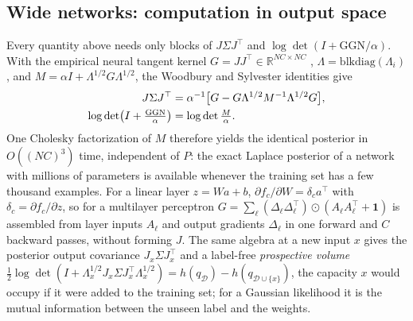 \documentclass[10pt,twocolumn,letterpaper]{article}
\theoremstyle{definition}
\newcommand{\logdet}{\log\det}
\newcommand{\D}{\mathcal{D}}
\newcommand{\T}{^{\top}}
\begin{document}
\subsection{Wide networks: computation in output space}\label{sec:kernel}
Every quantity above needs only blocks of $J\Sigma J\T$ and $\logdet(I+\mathrm{GGN}/\alpha)$. With the empirical neural tangent kernel $G=JJ\T\in\mathbb{R}^{NC\times NC}$ \citep{jacot2018}, $\Lambda=\mathrm{blkdiag}(\Lambda_i)$, and $M=\alpha I+\Lambda^{1/2}G\Lambda^{1/2}$, the Woodbury and Sylvester identities give
\begin{align}
J\Sigma J\T&=\alpha^{-1}\big[G-G\Lambda^{1/2}M^{-1}\Lambda^{1/2}G\big],\notag\\
\logdet\!\big(I+\tfrac{\mathrm{GGN}}{\alpha}\big)&=\logdet\tfrac{M}{\alpha}.
\label{eq:kernel}
\end{align}
One Cholesky factorization of $M$ therefore yields the identical posterior in $O((NC)^3)$ time, independent of $P$: the exact Laplace posterior of a network with millions of parameters is available whenever the training set has a few thousand examples. For a linear layer $z=Wa+b$, $\partial f_c/\partial W=\delta_c a\T$ with $\delta_c=\partial f_c/\partial z$, so for a multilayer perceptron $G=\sum_\ell(\Delta_\ell\Delta_\ell\T)\odot(A_\ell A_\ell\T+\mathbf{1})$ is assembled from layer inputs $A_\ell$ and output gradients $\Delta_\ell$ in one forward and $C$ backward passes, without forming $J$. The same algebra at a new input $x$ gives the posterior output covariance $J_x\Sigma J_x\T$ and a label-free \emph{prospective volume} $\tfrac12\logdet(I+\Lambda_x^{1/2}J_x\Sigma J_x\T\Lambda_x^{1/2})=h(q_\D)-h(q_{\D\cup\{x\}})$, the capacity $x$ would occupy if it were added to the training set; for a Gaussian likelihood it is the mutual information between the unseen label and the weights.
\end{document}
